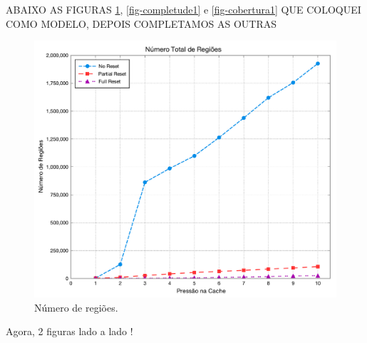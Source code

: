 \documentclass[12pt,twoside]{article}
\begin{document}
\begin{large}
ABAIXO AS FIGURAS \ref{fig-num_regs}, \ref{fig-completude1} e \ref{fig-cobertura1} QUE COLOQUEI COMO MODELO, DEPOIS COMPLETAMOS AS OUTRAS
\end{large}

\begin{figure}[h!]
\includegraphics[scale=0.4]{./figs/regions-number}
\caption{Número de regiões.}
\label{fig-num_regs}
\end{figure}

Agora, 2 figuras lado a lado !
\end{document}
